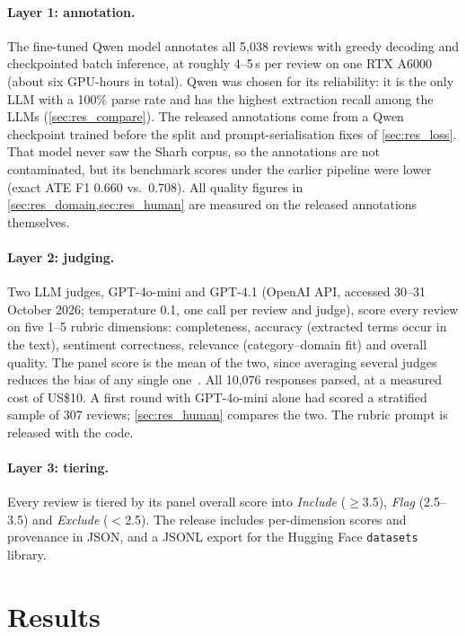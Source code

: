 \documentclass[runningheads]{llncs}
\begin{document}
\paragraph{Layer 1: annotation.} The fine-tuned Qwen model annotates all 5,038 reviews with greedy decoding and checkpointed batch inference, at roughly 4--5\,s per review on one RTX A6000 (about six GPU-hours in total). Qwen was chosen for its reliability: it is the only LLM with a 100\% parse rate and has the highest extraction recall among the LLMs (\cref{sec:res_compare}). The released annotations come from a Qwen checkpoint trained before the split and prompt-serialisation fixes of \cref{sec:res_loss}. That model never saw the Sharh corpus, so the annotations are not contaminated, but its benchmark scores under the earlier pipeline were lower (exact ATE F1 0.660 vs.\ 0.708). All quality figures in \cref{sec:res_domain,sec:res_human} are measured on the released annotations themselves.

\paragraph{Layer 2: judging.} Two LLM judges, GPT-4o-mini and GPT-4.1 (OpenAI API, accessed 30--31 October 2026; temperature 0.1, one call per review and judge), score every review on five 1--5 rubric dimensions: completeness, accuracy (extracted terms occur in the text), sentiment correctness, relevance (category--domain fit) and overall quality. The panel score is the mean of the two, since averaging several judges reduces the bias of any single one~\cite{verga2024juries}. All 10,076 responses parsed, at a measured cost of US\$10. A first round with GPT-4o-mini alone had scored a stratified sample of 307 reviews; \cref{sec:res_human} compares the two. The rubric prompt is released with the code.

\paragraph{Layer 3: tiering.} Every review is tiered by its panel overall score into \emph{Include} ($\ge$3.5), \emph{Flag} (2.5--3.5) and \emph{Exclude} ($<$2.5). The release includes per-dimension scores and provenance in JSON, and a JSONL export for the Hugging Face \texttt{datasets} library.

\section{Results}
\label{sec:results}
\end{document}
